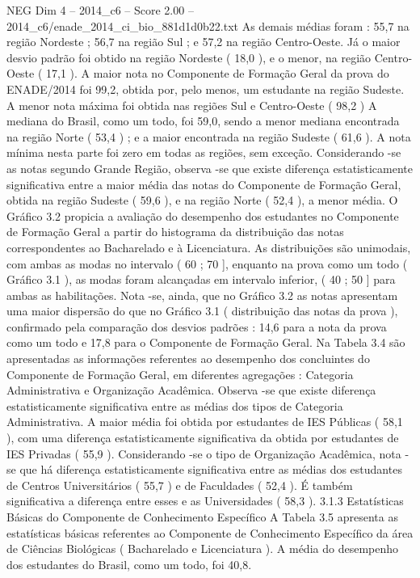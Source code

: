 \begin{textsample}{NEG Dim 4 – 2014\_c6 – Score 2.00 – 2014\_c6/enade\_2014\_ci\_bio\_881d1d0b22.txt}
As demais médias foram : 55,7 na região Nordeste ; 56,7 na região Sul ; e 57,2 na região Centro-Oeste.
Já o maior desvio padrão foi obtido na região Nordeste ( 18,0 ), e o menor, na região Centro-Oeste ( 17,1 ).
A maior nota no Componente de Formação Geral da prova do ENADE/2014 foi 99,2, obtida por, pelo menos, um estudante na região Sudeste.
A menor nota máxima foi obtida nas regiões Sul e Centro-Oeste ( 98,2 ) A mediana do Brasil, como um todo, foi 59,0, sendo a menor mediana encontrada na região Norte ( 53,4 ) ; e a maior encontrada na região Sudeste ( 61,6 ).
A nota mínima nesta parte foi zero em todas as regiões, sem exceção.
Considerando -se as notas segundo Grande Região, observa -se que existe diferença estatisticamente significativa entre a maior média das notas do Componente de Formação Geral, obtida na região Sudeste ( 59,6 ), e na região Norte ( 52,4 ), a menor média.
O Gráfico 3.2 propicia a avaliação do desempenho dos estudantes no Componente de Formação Geral a partir do histograma da distribuição das notas correspondentes ao Bacharelado e à Licenciatura.
As distribuições são unimodais, com ambas as modas no intervalo ( 60 ; 70 ], enquanto na prova como um todo ( Gráfico 3.1 ), as modas foram alcançadas em intervalo inferior, ( 40 ; 50 ] para ambas as habilitações.
Nota -se, ainda, que no Gráfico 3.2 as notas apresentam uma maior dispersão do que no Gráfico 3.1 ( distribuição das notas da prova ), confirmado pela comparação dos desvios padrões : 14,6 para a nota da prova como um todo e 17,8 para o Componente de Formação Geral.
Na Tabela 3.4 são apresentadas as informações referentes ao desempenho dos concluintes do Componente de Formação Geral, em diferentes agregações : Categoria Administrativa e Organização Acadêmica.
Observa -se que existe diferença estatisticamente significativa entre as médias dos tipos de Categoria Administrativa.
A maior média foi obtida por estudantes de IES Públicas ( 58,1 ), com uma diferença estatisticamente significativa da obtida por estudantes de IES Privadas ( 55,9 ).
Considerando -se o tipo de Organização Acadêmica, nota -se que há diferença estatisticamente significativa entre as médias dos estudantes de Centros Universitários ( 55,7 ) e de Faculdades ( 52,4 ).
É também significativa a diferença entre esses e as Universidades ( 58,3 ). 3.1.3 Estatísticas Básicas do Componente de Conhecimento Específico A Tabela 3.5 apresenta as estatísticas básicas referentes ao Componente de Conhecimento Específico da área de Ciências Biológicas ( Bacharelado e Licenciatura ).
A média do desempenho dos estudantes do Brasil, como um todo, foi 40,8.

\end{textsample}
